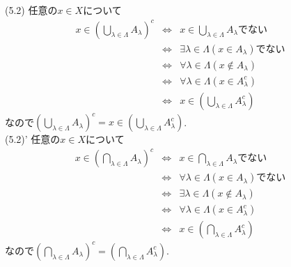 \documentclass{jsarticle}
\begin{document}
\subsection{} %
\noindent
(5.2) 任意の$x \in X$について
\begin{eqnarray*}
	x \in \left(\bigcup_{\lambda \in \Lambda}A_\lambda\right)^c
	&\Leftrightarrow& x \in \bigcup_{\lambda \in \Lambda}A_\lambda でない\\
	&\Leftrightarrow& \exists{\lambda \in \Lambda}(x \in A_\lambda)でない\\
	&\Leftrightarrow& \forall{\lambda \in \Lambda}(x \notin A_\lambda)\\
	&\Leftrightarrow& \forall{\lambda \in \Lambda}(x \in A^c_\lambda)\\
	&\Leftrightarrow& x \in \left(\bigcup_{\lambda \in \Lambda}A_\lambda^c\right)
\end{eqnarray*}
なので$\left(\bigcup_{\lambda \in \Lambda}A_\lambda\right)^c = x \in \left(\bigcup_{\lambda \in \Lambda}A_\lambda^c\right)$.\\
(5.2)' 任意の$x \in X$について
\begin{eqnarray*}
	x \in \left(\bigcap_{\lambda \in \Lambda}A_\lambda\right)^c
	&\Leftrightarrow& x \in \bigcap_{\lambda \in \Lambda}A_\lambda でない\\
	&\Leftrightarrow& \forall{\lambda \in \Lambda}(x \in A_\lambda)でない\\
	&\Leftrightarrow& \exists{\lambda \in \Lambda}(x \notin A_\lambda)\\
	&\Leftrightarrow& \forall{\lambda \in \Lambda}(x \in A^c_\lambda)\\
	&\Leftrightarrow& x \in \left(\bigcap_{\lambda \in \Lambda}A_\lambda^c\right)
\end{eqnarray*}
なので$\left(\bigcap_{\lambda \in \Lambda}A_\lambda\right)^c = \left(\bigcap_{\lambda \in \Lambda}A_\lambda^c\right)$.
\end{document}
